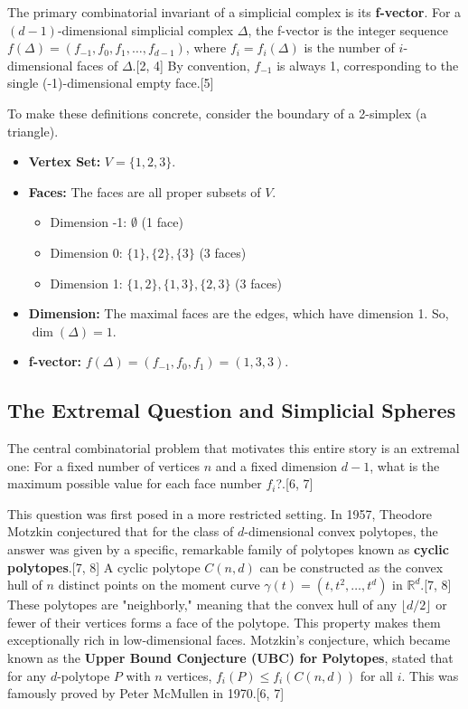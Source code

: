 \documentclass[11pt]{article}
\begin{document}
The primary combinatorial invariant of a simplicial complex is its \textbf{f-vector}. For a $(d-1)$-dimensional simplicial complex $\Delta$, the f-vector is the integer sequence $f(\Delta) = (f_{-1}, f_0, f_1, \ldots, f_{d-1})$, where $f_i = f_i(\Delta)$ is the number of $i$-dimensional faces of $\Delta$.[2, 4] By convention, $f_{-1}$ is always 1, corresponding to the single (-1)-dimensional empty face.[5]

To make these definitions concrete, consider the boundary of a 2-simplex (a triangle).
\begin{itemize}
    \item \textbf{Vertex Set:} $V = \{1, 2, 3\}$.
    \item \textbf{Faces:} The faces are all proper subsets of $V$.
    \begin{itemize}
        \item Dimension -1: $\emptyset$ (1 face)
        \item Dimension 0: $\{1\}, \{2\}, \{3\}$ (3 faces)
        \item Dimension 1: $\{1,2\}, \{1,3\}, \{2,3\}$ (3 faces)
    \end{itemize}
    \item \textbf{Dimension:} The maximal faces are the edges, which have dimension 1. So, $\dim(\Delta) = 1$.
    \item \textbf{f-vector:} $f(\Delta) = (f_{-1}, f_0, f_1) = (1, 3, 3)$.
\end{itemize}

\subsection{The Extremal Question and Simplicial Spheres}

The central combinatorial problem that motivates this entire story is an extremal one: For a fixed number of vertices $n$ and a fixed dimension $d-1$, what is the maximum possible value for each face number $f_i$?.[6, 7]

This question was first posed in a more restricted setting. In 1957, Theodore Motzkin conjectured that for the class of $d$-dimensional convex polytopes, the answer was given by a specific, remarkable family of polytopes known as \textbf{cyclic polytopes}.[7, 8] A cyclic polytope $C(n,d)$ can be constructed as the convex hull of $n$ distinct points on the moment curve $\gamma(t) = (t, t^2, \ldots, t^d)$ in $\mathbb{R}^d$.[7, 8] These polytopes are "neighborly," meaning that the convex hull of any $\lfloor d/2 \rfloor$ or fewer of their vertices forms a face of the polytope. This property makes them exceptionally rich in low-dimensional faces. Motzkin's conjecture, which became known as the \textbf{Upper Bound Conjecture (UBC) for Polytopes}, stated that for any $d$-polytope $P$ with $n$ vertices, $f_i(P) \le f_i(C(n,d))$ for all $i$. This was famously proved by Peter McMullen in 1970.[6, 7]
\end{document}

